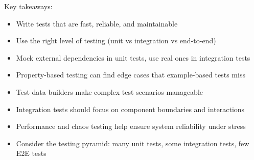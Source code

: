 \documentclass[12pt,a4paper]{article}
\begin{document}
Key takeaways:
\begin{itemize}
\item Write tests that are fast, reliable, and maintainable
\item Use the right level of testing (unit vs integration vs end-to-end)
\item Mock external dependencies in unit tests, use real ones in integration tests
\item Property-based testing can find edge cases that example-based tests miss
\item Test data builders make complex test scenarios manageable
\item Integration tests should focus on component boundaries and interactions
\item Performance and chaos testing help ensure system reliability under stress
\item Consider the testing pyramid: many unit tests, some integration tests, few E2E tests
\end{itemize}
\end{document}
